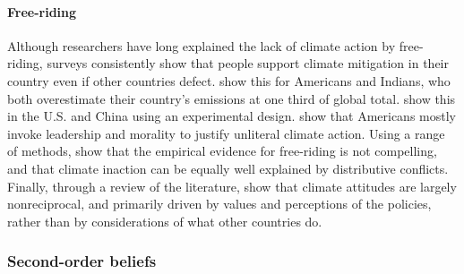 \paragraph{Free-riding}

Although researchers have long explained the lack of climate action by free-riding, surveys consistently show that people support climate mitigation in their country even if other countries defect. \citet{bernauer_how_2015} show this for Americans and Indians, who both overestimate their country's emissions at one third of global total. \citet{beiser-mcgrath_commitment_2019} show this in the U.S. and China using an experimental design. \citet{mcevoy_prospects_2016} show that Americans mostly invoke leadership and morality to justify unliteral climate action. Using a range of methods, \citet{aklin_prisoners_2020} show that the empirical evidence for free-riding is not compelling, and that climate inaction can be equally well explained by distributive conflicts. Finally, through a review of the literature, \citet{mcgrath_how_2017} show that climate attitudes are largely nonreciprocal, and primarily driven by values and perceptions of the policies, rather than by considerations of what other countries do.

\subsubsection{Second-order beliefs}\label{subsubsec:literature_beliefs}

